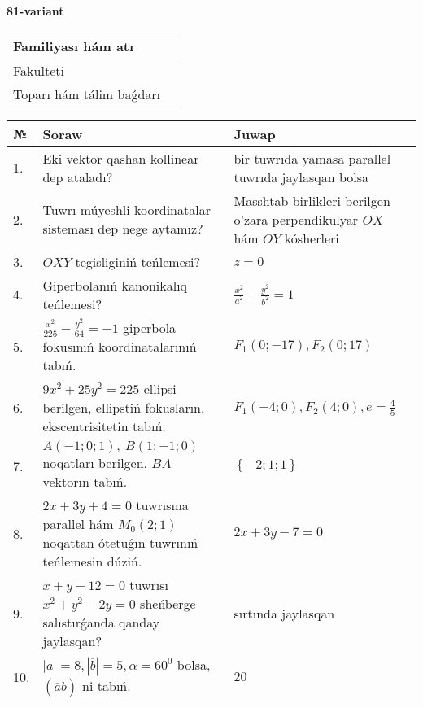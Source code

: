 \documentclass{article}
\begin{document}
\egroup

\newpage


\textbf{81-variant}\\

\bgroup
\def\arraystretch{1.6} %

\begin{tabular}{|m{5.7cm}|m{9.5cm}|}
\hline
Familiyası hám atı & \\
\hline
Fakulteti  & \\
\hline
Toparı hám tálim baǵdarı  & \\
\hline
\end{tabular}

\vspace{1cm}

\begin{tabular}{|m{0.7cm}|m{10cm}|m{4cm}|}
\hline
№ & Soraw & Juwap \\
\hline
1. & Eki vektor qashan kollinear dep ataladı? & bir tuwrıda yamasa parallel tuwrıda jaylasqan bolsa \\
\hline
2. & Tuwrı múyeshli koordinatalar sisteması dep nege aytamız? & Masshtab birlikleri berilgen o'zara perpendikulyar $OX$ hám $OY$ kósherleri \\
\hline
3. & $OXY$ tegisliginiń teńlemesi? & $z=0$ \\
\hline
4. & Giperbolanıń kanonikalıq teńlemesi? & $\frac{x^2}{a^2}-\frac{y^2}{b^2}=1$ \\
\hline
5. & $\frac{x^{2}}{225}-\frac{y^{2}}{64}=-1$ giperbola fokusınıń koordinatalarınıń tabıń. & $F_{1}(0;-17), F_{2}(0;17)$ \\
\hline
6. & $9x^{2}+25y^{2}=225$ ellipsi berilgen, ellipstiń fokusların, ekscentrisitetin tabıń. & $F_1\left(-4;0 \right) , F_2\left( 4;0 \right) , e = \frac{4}{5}$ \\
\hline
7. & $A (-1;0;1),\ B (1;-1;0)$ noqatları berilgen. $\overline{BA}$ vektorın tabıń. & $\left\{ - 2;1;1 \right\}$ \\
\hline
8. & $2x+3y+4=0$ tuwrısına parallel hám $M_{0} (2;1)$ noqattan ótetuǵın tuwrınıń teńlemesin dúziń. & $2x+3y-7=0$ \\
\hline
9. & $x+y-12=0$ tuwrısı $x^{2}+y^{2}-2y=0$ sheńberge salıstırǵanda qanday jaylasqan? & sırtında jaylasqan \\
\hline
10. & $\left| \overline{a} \right|=8, \left| \overline{b} \right|=5, \alpha=60^{0}$ bolsa, $( \overline{a}\overline{b} )$ ni tabıń. & $20$ \\
\hline
\end{tabular}
\end{document}
